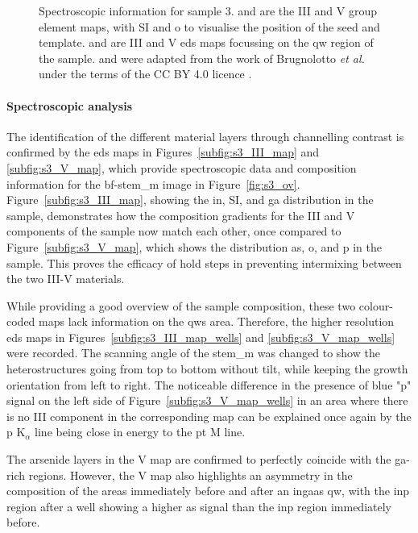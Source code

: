\begin{figure}
{    }
    \caption[Spectroscopic analysis of sample 3.]{Spectroscopic information for sample 3.  and  are the III and V group element maps, with \acs{SI} and \acs{o} to visualise the position of the seed and template.  and  are III and V \acs{eds} maps focussing on the \acl{qw} region of the sample.  and  were adapted from the work of Brugnolotto \textit{et al.} \cite{Brugnolotto2023} under the terms of the CC BY 4.0 licence \cite{CCBY40}.}
    \label{fig:s3_maps}
\end{figure}

\paragraph{Spectroscopic analysis} The identification of the different material layers through channelling contrast is confirmed by the \acs{eds} maps in Figures~\ref{subfig:s3_III_map} and \ref{subfig:s3_V_map}, which provide spectroscopic data and composition information for the \acs{bf}-\acs{stem_m} image in Figure~\ref{fig:s3_ov}. Figure~\ref{subfig:s3_III_map}, showing the \acl{in}, \acl{SI}, and \acl{ga} distribution in the sample, demonstrates how the composition gradients for the III and V components of the sample now match each other, once compared to Figure~\ref{subfig:s3_V_map}, which shows the distribution \acl{as}, \acl{o}, and \acl{p} in the sample. This proves the efficacy of hold steps in preventing intermixing between the two III-V materials.

While providing a good overview of the sample composition, these two colour-coded maps lack information on the \acl{qw}s area. Therefore, the higher resolution \acs{eds} maps in Figures~\ref{subfig:s3_III_map_wells} and \ref{subfig:s3_V_map_wells} were recorded. The scanning angle of the \acs{stem_m} was changed to show the heterostructures going from top to bottom without tilt, while keeping the growth orientation from left to right. The noticeable difference in the presence of blue "\acl{p}" signal on the left side of Figure~\ref{subfig:s3_V_map_wells} in an area where there is no III component in the corresponding map can be explained once again by the \acl{p} K\(_\alpha\) line being close in energy to the \acl{pt} M line. 

The arsenide layers in the V map are confirmed to perfectly coincide with the \acs{ga}-rich regions. However, the V map also highlights an asymmetry in the composition of the areas immediately before and after an \acs{ingaas} \acl{qw}, with the \acs{inp} region after a well showing a higher \acl{as} signal than the \acs{inp} region immediately before.

